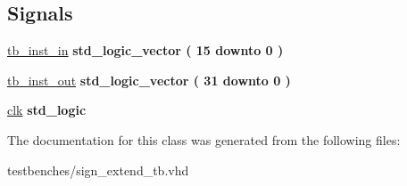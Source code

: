 \subsection*{\-Signals}
 \begin{DoxyCompactItemize}
\item 
\hypertarget{classsign__extend__tb_1_1behavioral_a195679646fa56787dd40a959d5db389b}{\hyperlink{classsign__extend__tb_1_1behavioral_a195679646fa56787dd40a959d5db389b}{tb\-\_\-inst\-\_\-in} {\bfseries std\-\_\-logic\-\_\-vector (   15    downto    0  ) } }\label{classsign__extend__tb_1_1behavioral_a195679646fa56787dd40a959d5db389b}

\item 
\hypertarget{classsign__extend__tb_1_1behavioral_a71f8643ece1a5e3b2f2ba929e151a00d}{\hyperlink{classsign__extend__tb_1_1behavioral_a71f8643ece1a5e3b2f2ba929e151a00d}{tb\-\_\-inst\-\_\-out} {\bfseries std\-\_\-logic\-\_\-vector (   31    downto    0  ) } }\label{classsign__extend__tb_1_1behavioral_a71f8643ece1a5e3b2f2ba929e151a00d}

\item 
\hypertarget{classsign__extend__tb_1_1behavioral_af5c312450d9816b418bbe2f10c031a4b}{\hyperlink{classsign__extend__tb_1_1behavioral_af5c312450d9816b418bbe2f10c031a4b}{clk} {\bfseries std\-\_\-logic } }\label{classsign__extend__tb_1_1behavioral_af5c312450d9816b418bbe2f10c031a4b}

\end{DoxyCompactItemize}


\-The documentation for this class was generated from the following files\-:\begin{DoxyCompactItemize}
\item 
testbenches/sign\-\_\-extend\-\_\-tb.\-vhd\end{DoxyCompactItemize}
